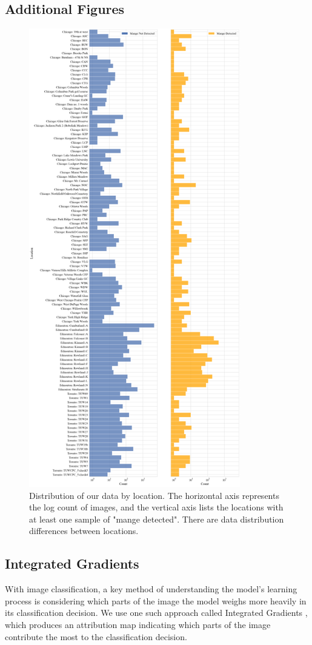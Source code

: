 \documentclass{article}
\begin{document}
\subsection{Additional Figures}
\begin{figure}[H]
\centering
\vspace{-0.5cm}
\includegraphics[height=20cm]{fig5.png}
\caption{\label{fig:output}Distribution of our data by location. The horizontal axis represents the log count of images, and the vertical axis lists the locations with at least one sample of "mange detected". There are data distribution differences between locations.}
\end{figure}

\subsection{Integrated Gradients}
With image classification, a key method of understanding the model's learning process is considering which parts of the image the model weighs more heavily in its classification decision. We use one such approach called Integrated Gradients \cite{sundararajan:2017}, which produces an attribution map indicating which parts of the image contribute the most to the classification decision. \\
\end{document}
